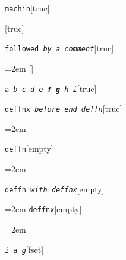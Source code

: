 \documentclass{book}
\begin{document}
%
\noindent\texttt{machin}\hfill[truc]



%
\noindent\texttt{}\hfill[truc]



\noindent\texttt{followed \bgroup{}\normalfont{}\textsl{by a comment}\egroup{}}\hfill[truc]



%
\par\begingroup\obeylines\obeyspaces\frenchspacing\leftskip=2em\relax\parskip=0pt\relax\ttfamily{}%
\endgroup{}%
\noindent\texttt{}\hfill[]



\noindent\texttt{a \bgroup{}\normalfont{}\textsl{b c d e \textbf{f g} h i}\egroup{}}\hfill[truc]



%
\noindent\texttt{deffnx \bgroup{}\normalfont{}\textsl{before end deffn}\egroup{}}\hfill[truc]



%
\par\begingroup\obeylines\obeyspaces\frenchspacing\leftskip=2em\relax\parskip=0pt\relax\ttfamily{}%


\endgroup{}%
\noindent\texttt{deffn}\hfill[empty]



%
\par\begingroup\obeylines\obeyspaces\frenchspacing\leftskip=2em\relax\parskip=0pt\relax\ttfamily{}%

\endgroup{}%
\noindent\texttt{deffn \bgroup{}\normalfont{}\textsl{with deffnx}\egroup{}}\hfill[empty]



%
\par\begingroup\obeylines\obeyspaces\frenchspacing\leftskip=2em\relax\parskip=0pt\relax\ttfamily{}%
\endgroup{}%
\noindent\texttt{deffnx}\hfill[empty]



%
\par\begingroup\obeylines\obeyspaces\frenchspacing\leftskip=2em\relax\parskip=0pt\relax\ttfamily{}%

\endgroup{}%
\noindent\texttt{\textsl{i} \bgroup{}\normalfont{}\textsl{a g}\egroup{}}\hfill[fset]
\end{document}
